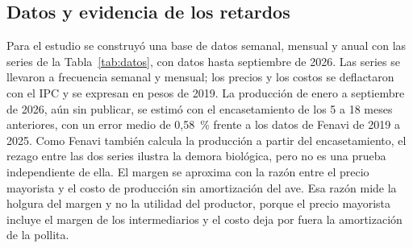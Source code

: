 \documentclass[preprint,12pt,authoryear]{elsarticle}
\begin{document}
\subsection{Datos y evidencia de los retardos}
\label{sec3.4}

Para el estudio se construyó una base de datos semanal, mensual y anual con las series de la Tabla~\ref{tab:datos}, con datos hasta septiembre de 2026. Las series se llevaron a frecuencia semanal y mensual; los precios y los costos se deflactaron con el IPC y se expresan en pesos de 2019. La producción de enero a septiembre de 2026, aún sin publicar, se estimó con el encasetamiento de los 5 a 18 meses anteriores, con un error medio de 0,58~\% frente a los datos de Fenavi de 2019 a 2025. Como Fenavi también calcula la producción a partir del encasetamiento, el rezago entre las dos series ilustra la demora biológica, pero no es una prueba independiente de ella. El margen se aproxima con la razón entre el precio mayorista y el costo de producción sin amortización del ave. Esa razón mide la holgura del margen y no la utilidad del productor, porque el precio mayorista incluye el margen de los intermediarios y el costo deja por fuera la amortización de la pollita.
\end{document}
